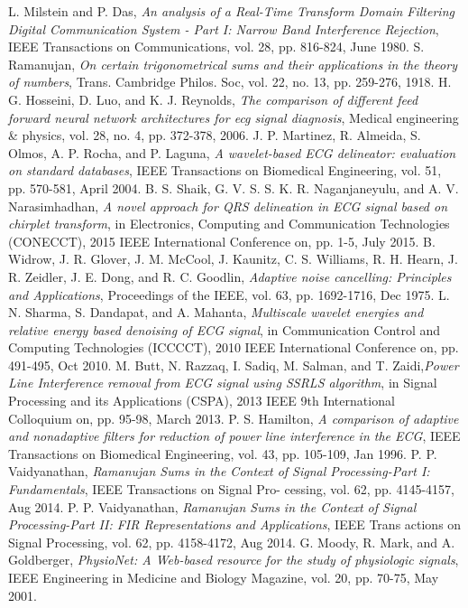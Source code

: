 \documentclass[conference]{IEEEtran}
\begin{document}
\begin{thebibliography}{10}
 L. Milstein and P. Das, {\em An analysis of a Real-Time Transform
Domain Filtering Digital Communication System - Part I: Narrow 
Band Interference Rejection}, IEEE Transactions on Communications,
vol. 28, pp. 816-824, June 1980.
  S. Ramanujan, {\em On certain trigonometrical sums and their applications
in the theory of numbers}, Trans. Cambridge Philos. Soc, vol. 22,
no. 13, pp. 259-276, 1918.
 H. G. Hosseini, D. Luo, and K. J. Reynolds, {\em The comparison of
different feed forward neural network architectures for ecg signal
diagnosis},  Medical engineering \& physics, vol. 28, no. 4, pp. 372-378, 2006.
 J. P. Martinez, R. Almeida, S. Olmos, A. P. Rocha, and P. Laguna, {\em A
wavelet-based ECG delineator: evaluation on standard databases},  IEEE
Transactions on Biomedical Engineering, vol. 51, pp. 570-581, April
2004.
 B. S. Shaik, G. V. S. S. K. R. Naganjaneyulu, and A. V. Narasimhadhan,
{\em A novel approach for QRS delineation in ECG signal based on
chirplet transform},  in Electronics, Computing and Communication
Technologies (CONECCT), 2015 IEEE International Conference on,
pp. 1-5, July 2015.
B. Widrow, J. R. Glover, J. M. McCool, J. Kaunitz, C. S. Williams,
R. H. Hearn, J. R. Zeidler, J. E. Dong, and R. C. Goodlin, {\em Adaptive
noise cancelling: Principles and Applications},  Proceedings of the IEEE,
vol. 63, pp. 1692-1716, Dec 1975.
 L. N. Sharma, S. Dandapat, and A. Mahanta, {\em Multiscale wavelet
energies and relative energy based denoising of ECG signal},  in
Communication Control and Computing Technologies (ICCCCT), 2010
IEEE International Conference on, pp. 491-495, Oct 2010.
 M. Butt, N. Razzaq, I. Sadiq, M. Salman, and T. Zaidi,{\em Power
Line Interference removal from ECG signal using SSRLS algorithm},
in Signal Processing and its Applications (CSPA), 2013 IEEE 9th
International Colloquium on, pp. 95-98, March 2013.
 P. S. Hamilton, {\em A comparison of adaptive and nonadaptive filters for
reduction of power line interference in the ECG},  IEEE Transactions
on Biomedical Engineering, vol. 43, pp. 105-109, Jan 1996.
 P. P. Vaidyanathan, {\em Ramanujan Sums in the Context of Signal
Processing-Part I: Fundamentals},  IEEE Transactions on Signal Pro-
cessing, vol. 62, pp. 4145-4157, Aug 2014.
 P. P. Vaidyanathan, {\em Ramanujan Sums in the Context of Signal
Processing-Part II: FIR Representations and Applications}, IEEE Trans
actions on Signal Processing, vol. 62, pp. 4158-4172, Aug 2014.
 G. Moody, R. Mark, and A. Goldberger, {\em PhysioNet: A Web-based
resource for the study of physiologic signals}, IEEE Engineering in
Medicine and Biology Magazine, vol. 20, pp. 70-75, May 2001.
\end{thebibliography}
\end{document}
